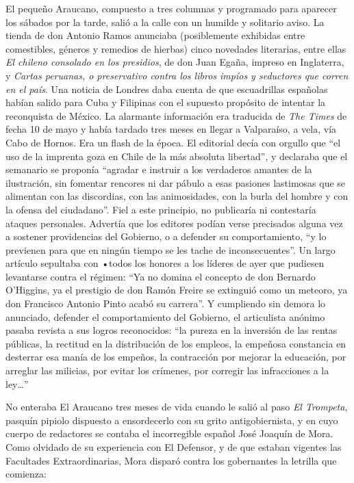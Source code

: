 \documentclass[10pt,twoside,openright]{memoir}
\begin{document}
El pequeño Araucano, compuesto a tres columnas y
 programado para aparecer los
sábados por la tarde, salió a la calle con un humilde y solitario aviso.
La tienda de don Antonio Ramos anunciaba (posiblemente exhibidas entre
comestibles, géneros y remedios de
hierbas) cinco novedades literarias, entre ellas \emph{El chileno
consolado en los presidios}, de don Juan Egaña, impreso en Inglaterra, y
\emph{Cartas peruanas, o preservativo contra los libros impíos y
seductores que corren en el país}. Una noticia de Londres daba cuenta de
que escuadrillas españolas habían salido para Cuba y Filipinas con el
supuesto propósito de intentar la reconquista de México. La alarmante
información era traducida de \emph{The Times} de fecha 10 de mayo y
había tardado tres meses en llegar a Valparaíso, a vela, vía Cabo de
Hornos. Era un flash de la época. El editorial decía con orgullo que
``el uso de la imprenta goza en Chile de la más absoluta libertad'', y
declaraba que el semanario se
proponía ``agradar e instruir a los verdaderos amantes de la
ilustración, sin fomentar rencores ni dar pábulo a esas pasiones
lastimosas que se alimentan con las discordias, con las animosidades,
con la burla del hombre y con la ofensa del ciudadano''. Fiel a este
principio, no publicaría ni contestaría ataques personales. Advertía que
los editores podían verse precisados alguna vez a sostener providencias
del Gobierno, o a defender su comportamiento, ``y lo previenen para que
en ningún tiempo se les tache de inconsecuentes''. Un largo artículo
sepultaba con •todos los honores a los líderes de ayer que pudiesen
levantarse contra el régimen: ``Ya no domina el concepto de don Bernardo
O'Higgins, ya el prestigio de don Ramón Freire se extinguió como un
meteoro, ya don Francisco Antonio Pinto acabó su carrera''. Y cumpliendo
sin demora lo anunciado, defender el comportamiento del Gobierno, el
articulista anónimo pasaba revista a
sus logros reconocidos: ``la pureza en la inversión de las rentas
públicas, la rectitud en la distribución de los empleos, la empeñosa
constancia en desterrar esa manía de los empeños, la contracción por
mejorar la educación, por arreglar las milicias, por evitar los
crímenes, por corregir las infracciones a la ley\ldots''

No enteraba El Araucano tres meses de vida cuando le salió al paso \emph{El
Trompeta}, pasquín pipiolo dispuesto a ensordecerlo con su grito
antigobiernista, y en cuyo cuerpo de redactores se contaba el
incorregible español José Joaquín de Mora. Como olvidado de su
experiencia con El Defensor, y de que estaban vigentes las Facultades
Extraordinarias, Mora disparó contra los gobernantes la letrilla que
comienza:
\end{document}
